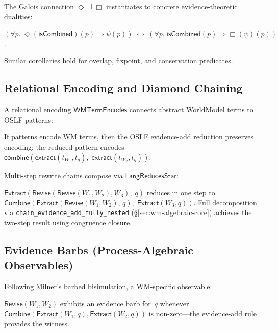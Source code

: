 \documentclass[11pt,openany]{report}
\begin{document}
The Galois connection $\Diamond \dashv \Box$ instantiates to concrete
evidence-theoretic dualities:

\begin{theorem}
$(\forall p.\; \Diamond(\mathsf{isCombined})(p) \Rightarrow \psi(p))
\;\Leftrightarrow\;
(\forall p.\; \mathsf{isCombined}(p) \Rightarrow \Box(\psi)(p))$.
\end{theorem}

\noindent
Similar corollaries hold for overlap, fixpoint, and conservation predicates.

\subsection{Relational Encoding and Diamond Chaining}

A relational encoding $\mathsf{WMTermEncodes}$ connects abstract
WorldModel terms to OSLF patterns:

\begin{theorem}
If patterns encode WM terms, then the OSLF evidence-add reduction preserves
encoding: the reduced pattern encodes
$\mathsf{combine}(\mathsf{extract}(t_{W_1}, t_q),\;
\mathsf{extract}(t_{W_2}, t_q))$.
\end{theorem}

Multi-step rewrite chains compose via $\mathsf{LangReducesStar}$:

\begin{theorem}
$\mathsf{Extract}(\mathsf{Revise}(\mathsf{Revise}(W_1, W_2), W_3),\; q)$
reduces in one step to
$\mathsf{Combine}(\mathsf{Extract}(\mathsf{Revise}(W_1,W_2),\,q),\;
\mathsf{Extract}(W_3,q))$.
Full decomposition via \texttt{chain\_evidence\_add\_fully\_nested}
(\S\ref{sec:wm-algebraic-core}) achieves the two-step result using
congruence closure.
\end{theorem}

\subsection{Evidence Barbs (Process-Algebraic Observables)}

Following Milner's barbed bisimulation, a WM-specific observable:

\begin{theorem}
$\mathsf{Revise}(W_1, W_2)$ exhibits an evidence barb for~$q$ whenever
$\mathsf{Combine}(\mathsf{Extract}(W_1,q), \mathsf{Extract}(W_2,q))$ is
non-zero---the evidence-add rule provides the witness.
\end{theorem}
\end{document}
